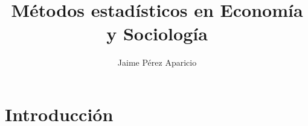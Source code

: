 \documentclass[a4paper,10pt,twocolumn]{article}
\author{Jaime P\'erez Aparicio}
\title{M\'etodos estad\'isticos en Econom\'ia y Sociolog\'ia}
\begin{document}
\maketitle

\section*{Introducci\'on}
\end{document}

